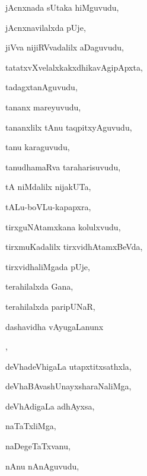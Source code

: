 \begin{multicols}{3}
{\noindent
{jAcnxnada sUtaka hiMguvudu}, \pageref{jAcnxnada sUtaka hiMguvudu}

\noindent
{jAcnxnavilalxda pUje}, \pageref{jAcnxnavilalxda pUje}

\noindent
{jiVva nijiRVvadalilx aDaguvudu}, \pageref{jiVva nijiRVvadalilx aDaguvudu}

\noindent
{tatatxvXvelalxkakxdhikavAgipApxta}, \pageref{tatatxvXvelalxkakxdhikavAgipApxta}

\noindent
{tadagxtanAguvudu}, \pageref{tadagxtanAguvudu}

\noindent
{tananx mareyuvudu}, \pageref{tananx mareyuvudu}

\noindent
{tananxlilx tAnu taqpitxyAguvudu}, \pageref{tananxlilx tAnu taqpitxyAguvudu}

\noindent
{tanu karaguvudu}, \pageref{tanu karaguvudu}

\noindent
{tanudhamaRva taraharisuvudu}, \pageref{tanudhamaRva taraharisuvudu}

\noindent
{tA niMdalilx nijakUTa}, \pageref{tA niMdalilx nijakUTa}

\noindent
{tALu-boVLu-kapapxra}, \pageref{tALu-boVLu-kapapxra}

\noindent
{tirxguNAtamxkana kolulxvudu}, \pageref{tirxguNAtamxkana kolulxvudu}

\noindent
{tirxmuKadalilx tirxvidhAtamxBeVda}, \pageref{tirxmuKadalilx tirxvidhAtamxBeVda}

\noindent
{tirxvidhaliMgada pUje}, \pageref{tirxvidhaliMgada pUje}

\noindent
{terahilalxda Gana}, \pageref{terahilalxda Gana}

\noindent
{terahilalxda paripUNaR}, \pageref{terahilalxda paripUNaR}

\noindent
{dashavidha vAyugaLanunx}

\noindent
{}, \pageref{dashavidha vAyugaLanunx nililxsuvudu}

\noindent
{deVhadeVhigaLa utapxtitxsathxla}, \pageref{deVhadeVhigaLa utapxtitxsathxla}

\noindent
{deVhaBAvashUnayxsharaNaliMga}, \pageref{deVhaBAvashUnayxsharaNaliMga}

\noindent
{deVhAdigaLa adhAyxsa}, \pageref{deVhAdigaLa adhAyxsa}

\noindent
{naTaTxliMga}, \pageref{naTaTxliMga}

\noindent
{naDegeTaTxvanu}, \pageref{naDegeTaTxvanu}

\noindent
{nAnu nAnAguvudu}, \pageref{nAnu nAnAguvudu}

}
\end{multicols}
